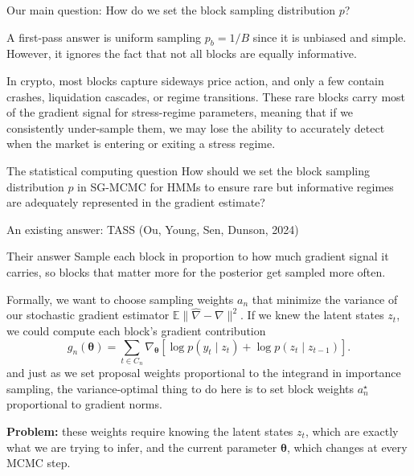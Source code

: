 \documentclass[aspectratio=169]{beamer}
\newcommand{\E}{\mathbb{E}}
\newcommand{\btheta}{\boldsymbol{\theta}}
\begin{document}
\begin{frame}{Our main question: How do we set the block sampling distribution $p$?}  

  \vspace{0.8em}
  \normalsize
  A first-pass answer is uniform sampling $p_b = 1/B$ since it is unbiased and simple. However, it ignores the fact that not all blocks are equally informative. 
  
  \vspace{0.5em}
  In crypto, most blocks capture sideways price action, and only a few contain crashes, liquidation cascades, or regime transitions. These rare blocks carry most of the gradient signal for stress-regime parameters, meaning that if we consistently under-sample them, we may lose the ability to accurately detect when the market is entering or exiting a stress regime.

  \vspace{0.5em}
  \begin{block}{The statistical computing question}
    How should we set the block sampling distribution $p$ in SG-MCMC for HMMs to ensure rare but informative regimes are adequately represented in the gradient estimate?
  \end{block}
\end{frame}

\begin{frame}{An existing answer: TASS (Ou, Young, Sen, Dunson, 2024)}
  \begin{block}{Their answer}
    Sample each block in proportion to how much gradient signal it carries, so blocks that matter more for the posterior get sampled more often.
  \end{block}

  \vspace{0.3em}
  Formally, we want to choose sampling weights $a_n$ that minimize the variance of our stochastic gradient estimator $\E\|\widehat{\nabla} - \nabla\|^2$. If we knew the latent states $z_t$, we could compute each block's gradient contribution
  \[
    g_n(\btheta) = \sum_{t \in C_n} \nabla_{\btheta} \left[\log p(y_t \mid z_t) + \log p(z_t \mid z_{t-1})\right].
  \]
  and just as we set proposal weights proportional to the integrand in importance sampling, the variance-optimal thing to do here is to set block weights $a_n^\star$ proportional to gradient norms.

  \vspace{0.3em}
  \textbf{Problem:} these weights require knowing the latent states $z_t$, which are exactly what we are trying to infer, and the current parameter $\btheta$, which changes at every MCMC step.
\end{frame}
\end{document}
